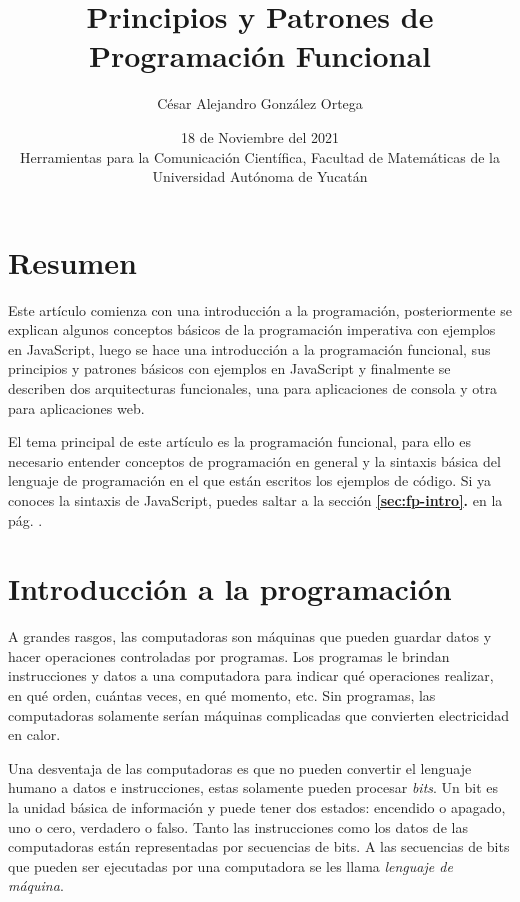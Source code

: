 \documentclass{article}
\begin{document}
\title{\Large{\textbf{Principios y Patrones de Programación Funcional}}}
\author{César Alejandro González Ortega}
\date{18 de Noviembre del 2021 \\
  \bigskip\normalsize{Herramientas para la Comunicación Científica, Facultad de Matemáticas de la Universidad Autónoma de Yucatán}}
\maketitle


\pagebreak
\section*{Resumen}
Este artículo comienza con una introducción a la programación, posteriormente se explican algunos conceptos básicos de la programación imperativa con ejemplos en JavaScript, luego se hace una introducción a la programación funcional, sus principios y patrones básicos con ejemplos en JavaScript y finalmente se describen dos arquitecturas funcionales, una para aplicaciones de consola y otra para aplicaciones web.

El tema principal de este artículo es la programación funcional, para ello es necesario entender conceptos de programación en general y la sintaxis básica del lenguaje de programación en el que están escritos los ejemplos de código. Si ya conoces la sintaxis de JavaScript, puedes saltar a la sección \textbf{\ref{sec:fp-intro}. } en la pág. \pageref{sec:fp-intro}.

\section{Introducción a la programación}
A grandes rasgos, las computadoras son máquinas que pueden guardar datos y hacer operaciones controladas por programas. Los programas le brindan instrucciones y datos a una computadora para indicar qué operaciones realizar, en qué orden, cuántas veces, en qué momento, etc. Sin programas, las computadoras solamente serían máquinas complicadas que convierten electricidad en calor.

Una desventaja de las computadoras es que no pueden convertir el lenguaje humano a datos e instrucciones, estas solamente pueden procesar \textit{bits}. Un bit es la unidad básica de información y puede tener dos estados: encendido o apagado, uno o cero, verdadero o falso. Tanto las instrucciones como los datos de las computadoras están representadas por secuencias de bits. A las secuencias de bits que pueden ser ejecutadas por una computadora se les llama \textit{lenguaje de máquina}.
\end{document}
